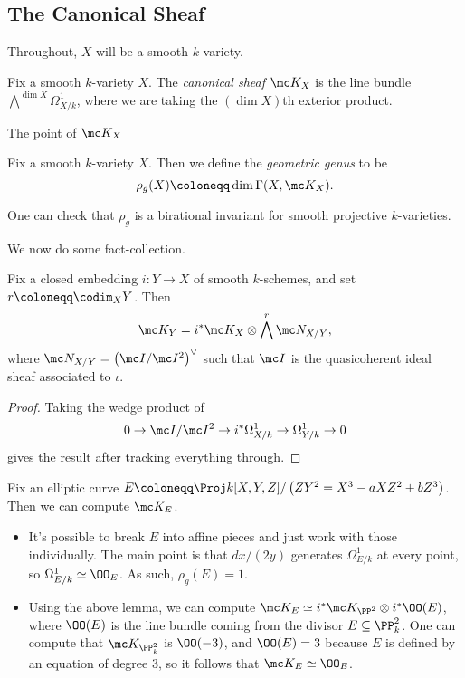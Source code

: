 \documentclass[../notes.tex]{subfiles}
\begin{document}
\subsection{The Canonical Sheaf}
Throughout, $X$ will be a smooth $k$-variety.
\begin{definition}
	Fix a smooth $k$-variety $X$. The \textit{canonical sheaf} $\mc K_X$ is the line bundle $\bigwedge^{\dim X}\Omega^1_{X/k}$, where we are taking the $(\dim X)$th exterior product.
\end{definition}
The point of $\mc K_X$ 
\begin{definition}
	Fix a smooth $k$-variety $X$. Then we define the \textit{geometric genus} to be
	\[\rho_g(X)\coloneqq\dim\Gamma(X,\mc K_X).\]
\end{definition}
\begin{remark}
	One can check that $\rho_g$ is a birational invariant for smooth projective $k$-varieties.
\end{remark}
We now do some fact-collection.
\begin{lemma}
	Fix a closed embedding $i\colon Y\to X$ of smooth $k$-schemes, and set $r\coloneqq\codim_XY$. Then
	\[\mc K_Y=i^*\mc K_X\otimes\bigwedge^r\mc N_{X/Y},\]
	where $\mc N_{X/Y}=\left(\mc I/\mc I^2\right)^\lor$ such that $\mc I$ is the quasicoherent ideal sheaf associated to $\iota$.
\end{lemma}
\begin{proof}
	Taking the wedge product of
	\[0\to\mc I/\mc I^2\to i^*\Omega^1_{X/k}\to\Omega^1_{Y/k}\to0\]
	gives the result after tracking everything through.
\end{proof}
\begin{example}
	Fix an elliptic curve $E\coloneqq\Proj k[X,Y,Z]/\left(ZY^2=X^3-aXZ^2+bZ^3\right)$. Then we can compute $\mc K_E$.
	\begin{itemize}
		\item It's possible to break $E$ into affine pieces and just work with those individually. The main point is that $dx/(2y)$ generates $\Omega^1_{E/k}$ at every point, so $\Omega^1_{E/k}\simeq\OO_E$. As such, $\rho_g(E)=1$.
		\item Using the above lemma, we can compute $\mc K_E\simeq i^*\mc K_{\PP^2}\otimes i^*\OO(E)$, where $\OO(E)$ is the line bundle coming from the divisor $E\subseteq\PP^2_k$. One can compute that $\mc K_{\PP^2_k}$ is $\OO(-3)$, and $\OO(E)=3$ because $E$ is defined by an equation of degree $3$, so it follows that $\mc K_E\simeq\OO_E$.
	\end{itemize}
\end{example}
\end{document}
